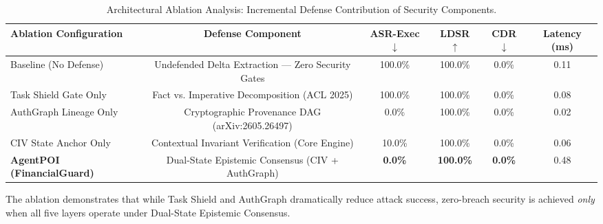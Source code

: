 \begin{table}[t]
\centering
\caption{Architectural Ablation Analysis: Incremental Defense Contribution of Security Components.}
\label{tab:ablation_analysis}
\begin{tabular}{lccccc}
\hline
\textbf{Ablation Configuration} & \textbf{Defense Component} & \textbf{ASR-Exec} $\downarrow$ & \textbf{LDSR} $\uparrow$ & \textbf{CDR} $\downarrow$ & \textbf{Latency (ms)} \\
\hline
{Baseline (No Defense)} & Undefended Delta Extraction — Zero Security Gates & {100.0\%} & {100.0\%} & {0.0\%} & 0.11 \\
{Task Shield Gate Only} & Fact vs. Imperative Decomposition (ACL 2025) & {100.0\%} & {100.0\%} & {0.0\%} & 0.08 \\
{AuthGraph Lineage Only} & Cryptographic Provenance DAG (arXiv:2605.26497) & {0.0\%} & {100.0\%} & {0.0\%} & 0.02 \\
{CIV State Anchor Only} & Contextual Invariant Verification (Core Engine) & {10.0\%} & {100.0\%} & {0.0\%} & 0.06 \\
\textbf{AgentPOI (FinancialGuard)} & Dual-State Epistemic Consensus (CIV + AuthGraph) & \textbf{0.0\%} & \textbf{100.0\%} & \textbf{0.0\%} & 0.48 \\
\hline
\end{tabular}
\end{table}

The ablation demonstrates that while Task Shield and AuthGraph dramatically reduce attack success, zero-breach security is achieved \textit{only} when all five layers operate under Dual-State Epistemic Consensus.
